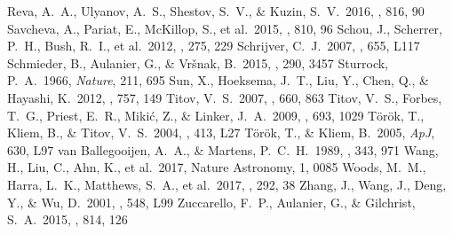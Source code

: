 \documentclass[10pt,preprint2]{aastex}
\begin{document}
\begin{thebibliography}{}
 Reva, A.~A., Ulyanov, A.~S., Shestov, S.~V., \& Kuzin, S.~V.\ 2016, \apj, 816, 90 
 Savcheva, A., Pariat, E., McKillop, S., et al.\ 2015, \apj, 810, 96 
 Schou, J., Scherrer, P.~H., Bush, R.~I., et al.\ 2012, \solphys, 275, 229
 Schrijver, C.~J.\ 2007, \apjl, 655, L117 
 Schmieder, B., Aulanier, G., \& Vr{\v s}nak, B.\ 2015, \solphys, 290, 3457 
 Sturrock, P.~A.\ 1966, {\it Nature}, 211, 695
 Sun, X., Hoeksema, J.~T., Liu, Y., Chen, Q., \& Hayashi, K.\ 2012, \apj, 757, 149 
 Titov, V.~S.\ 2007, \apj, 660, 863 
 Titov, V.~S., Forbes, T.~G., Priest, E.~R., Miki{\'c}, Z., \& Linker, J.~A.\ 2009, \apj, 693, 1029 
 T{\"o}r{\"o}k, T., Kliem, B., \& Titov, V.~S.\ 2004, \aap, 413, L27 
  T\"or\"ok, T., \& Kliem, B.\ 2005, {\it ApJ}, 630, L97
 van Ballegooijen, A.~A., \& Martens, P.~C.~H.\ 1989, \apj, 343, 971
 Wang, H., Liu, C., Ahn, K., et al.\ 2017, Nature Astronomy, 1, 0085 
 Woods, M.~M., Harra, L.~K., Matthews, S.~A., et al.\ 2017, \solphys, 292, 38 
 Zhang, J., Wang, J., Deng, Y., \& Wu, D.\ 2001, \apjl, 548, L99 
 Zuccarello, F.~P., Aulanier, G., \& Gilchrist, S.~A.\ 2015, \apj, 814, 126 

\end{thebibliography}


\end{document}

